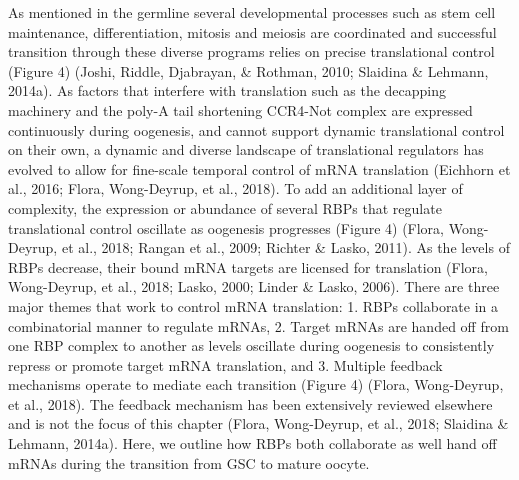 \documentclass[12pt,twoside]{reedthesis}
\begin{document}
As mentioned in the germline several developmental processes such as
stem cell maintenance, differentiation, mitosis and meiosis are
coordinated and successful transition through these diverse programs
relies on precise translational control (Figure 4) (Joshi, Riddle, Djabrayan, \& Rothman, 2010; Slaidina \& Lehmann, 2014a). As factors that interfere with translation such as
the decapping machinery and the poly-A tail shortening CCR4-Not complex
are expressed continuously during oogenesis, and cannot support dynamic
translational control on their own, a dynamic and diverse landscape of
translational regulators has evolved to allow for fine-scale temporal
control of mRNA translation (Eichhorn et al., 2016; Flora, Wong-Deyrup, et al., 2018). To add an
additional layer of complexity, the expression or abundance of several
RBPs that regulate translational control oscillate as oogenesis
progresses (Figure 4) (Flora, Wong-Deyrup, et al., 2018; Rangan et al., 2009; Richter \& Lasko, 2011). As
the levels of RBPs decrease, their bound mRNA targets are licensed for
translation (Flora, Wong-Deyrup, et al., 2018; Lasko, 2000; Linder \& Lasko, 2006). There are three
major themes that work to control mRNA translation: 1. RBPs collaborate
in a combinatorial manner to regulate mRNAs, 2. Target mRNAs are handed
off from one RBP complex to another as levels oscillate during oogenesis
to consistently repress or promote target mRNA translation, and 3.
Multiple feedback mechanisms operate to mediate each transition (Figure
4) (Flora, Wong-Deyrup, et al., 2018). The feedback mechanism has been extensively
reviewed elsewhere and is not the focus of this chapter (Flora, Wong-Deyrup, et al., 2018; Slaidina \& Lehmann, 2014a). Here, we outline how RBPs both collaborate as well
hand off mRNAs during the transition from GSC to mature oocyte.
\end{document}
